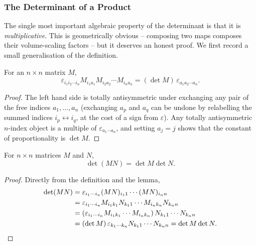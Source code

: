\documentclass[a4paper]{scrartcl}
\begin{document}
\subsubsection{The Determinant of a Product}

The single most important algebraic property of the determinant is that it is \emph{multiplicative}. This is geometrically obvious -- composing two maps composes their volume-scaling factors -- but it deserves an honest proof. We first record a small generalisation of the definition.

\begin{lemma}\label{lemma:epsdet}
	For an $n \times n$ matrix $M$,
	$$
	\varepsilon_{i_1 i_2 \cdots i_n}M_{i_1 a_1}M_{i_2 a_2} \cdots M_{i_n a_n} = (\det M) \, \varepsilon_{a_1 a_2 \cdots a_n}.
	$$
\end{lemma}
\begin{proof}
	The left hand side is totally antisymmetric under exchanging any pair of the free indices $a_1, \dots, a_n$ (exchanging $a_p$ and $a_q$ can be undone by relabelling the summed indices $i_p \leftrightarrow i_q$, at the cost of a sign from $\varepsilon$). Any totally antisymmetric $n$-index object is a multiple of $\varepsilon_{a_1 \cdots a_n}$, and setting $a_j = j$ shows that the constant of proportionality is $\det M$.
\end{proof}

\begin{theorem}
	For $n \times n$ matrices $M$ and $N$,
	$$
	\det (MN) = \det M \det N.
	$$
\end{theorem}
\begin{proof}
	Directly from the definition and the lemma,
	\begin{align*}
		\det(MN) &= \varepsilon_{i_1 \cdots i_n}(MN)_{i_1 1} \cdots (MN)_{i_n n} \\
		&= \varepsilon_{i_1 \cdots i_n} M_{i_1 k_1} N_{k_1 1} \cdots M_{i_n k_n} N_{k_n n} \\
		&= \left(\varepsilon_{i_1 \cdots i_n} M_{i_1 k_1} \cdots M_{i_n k_n}\right) N_{k_1 1} \cdots N_{k_n n} \\
		&= (\det M) \, \varepsilon_{k_1 \cdots k_n} N_{k_1 1} \cdots N_{k_n n} = \det M \det N. \qedhere
	\end{align*}
\end{proof}
\end{document}
